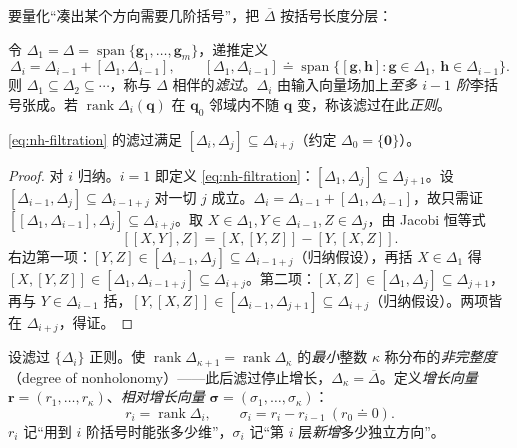 要量化“凑出某个方向需要几阶括号”，把 $\overline{\Delta}$ 按括号长度分层：

\begin{definition}[滤过（filtration）]\label{def:nh-filtration}
令 $\Delta_1=\Delta=\operatorname{span}\{\mathbf{g}_1,\dots,\mathbf{g}_m\}$，递推定义
\begin{equation}
  \Delta_i=\Delta_{i-1}+[\Delta_1,\Delta_{i-1}],\qquad
  [\Delta_1,\Delta_{i-1}]\doteq\operatorname{span}\{[\mathbf{g},\mathbf{h}]:\mathbf{g}\in\Delta_1,\ \mathbf{h}\in\Delta_{i-1}\}.
  \label{eq:nh-filtration}
\end{equation}
则 $\Delta_1\subseteq\Delta_2\subseteq\cdots$，称与 $\Delta$ 相伴的\emph{滤过}。$\Delta_i$ 由输入向量场加上\emph{至多 $i-1$ 阶}李括号张成。若 $\operatorname{rank}\Delta_i(\mathbf{q})$ 在 $\mathbf{q}_0$ 邻域内不随 $\mathbf{q}$ 变，称该滤过在此\emph{正则}。
\end{definition}

\begin{proposition}\label{prop:nh-graded}
\cref{eq:nh-filtration} 的滤过满足 $[\Delta_i,\Delta_j]\subseteq\Delta_{i+j}$（约定 $\Delta_0=\{\mathbf 0\}$）。
\end{proposition}
\begin{proof}
对 $i$ 归纳。$i=1$ 即定义 \cref{eq:nh-filtration}：$[\Delta_1,\Delta_j]\subseteq\Delta_{j+1}$。设 $[\Delta_{i-1},\Delta_j]\subseteq\Delta_{i-1+j}$ 对一切 $j$ 成立。$\Delta_i=\Delta_{i-1}+[\Delta_1,\Delta_{i-1}]$，故只需证 $[[\Delta_1,\Delta_{i-1}],\Delta_j]\subseteq\Delta_{i+j}$。取 $X\in\Delta_1,Y\in\Delta_{i-1},Z\in\Delta_j$，由 Jacobi 恒等式
\[
  [[X,Y],Z]=[X,[Y,Z]]-[Y,[X,Z]].
\]
右边第一项：$[Y,Z]\in[\Delta_{i-1},\Delta_j]\subseteq\Delta_{i-1+j}$（归纳假设），再括 $X\in\Delta_1$ 得 $[X,[Y,Z]]\in[\Delta_1,\Delta_{i-1+j}]\subseteq\Delta_{i+j}$。第二项：$[X,Z]\in[\Delta_1,\Delta_j]\subseteq\Delta_{j+1}$，再与 $Y\in\Delta_{i-1}$ 括，$[Y,[X,Z]]\in[\Delta_{i-1},\Delta_{j+1}]\subseteq\Delta_{i+j}$（归纳假设）。两项皆在 $\Delta_{i+j}$，得证。
\end{proof}

\begin{definition}\label{def:nh-growth}
设滤过 $\{\Delta_i\}$ 正则。使 $\operatorname{rank}\Delta_{\kappa+1}=\operatorname{rank}\Delta_{\kappa}$ 的\emph{最小}整数 $\kappa$ 称分布的\emph{非完整度}（degree of nonholonomy）——此后滤过停止增长，$\Delta_{\kappa}=\overline{\Delta}$。定义\emph{增长向量} $\mathbf r=(r_1,\dots,r_{\kappa})$、\emph{相对增长向量} $\boldsymbol\sigma=(\sigma_1,\dots,\sigma_{\kappa})$：
\begin{equation}
  r_i=\operatorname{rank}\Delta_i,\qquad \sigma_i=r_i-r_{i-1}\ (r_0\doteq0).
  \label{eq:nh-growth}
\end{equation}
$r_i$ 记“用到 $i$ 阶括号时能张多少维”，$\sigma_i$ 记“第 $i$ 层\emph{新增}多少独立方向”。
\end{definition}

